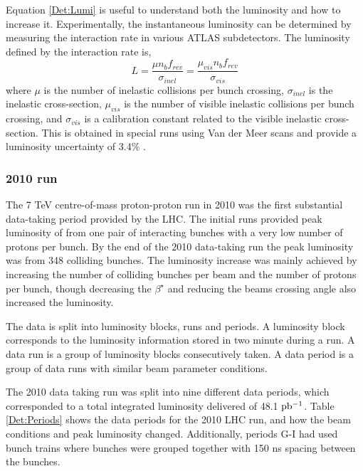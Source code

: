 Equation \ref{Det:Lumi} is useful to understand both the luminosity and how to increase it. 
Experimentally, the instantaneous luminosity can be determined by measuring the interaction rate in various ATLAS subdetectors.
The luminosity defined by the interaction rate is,
\begin{equation}
L=\frac{\mu n_bf_{rev}}{\sigma_{inel}}=\frac{\mu_{vis}n_bf_{rev}}{\sigma_{vis}}
\label{Det:Lumi2}
\end{equation}
where $\mu$ is the number of inelastic collisions per bunch crossing, $\sigma_{inel}$ is the inelastic cross-section, $\mu_{vis}$ is the number of visible inelastic collisions per bunch crossing, and $\sigma_{vis}$ is a calibration constant related to the visible inelastic cross-section. 
This is obtained in special runs using Van der Meer scans and provide a luminosity uncertainty of 3.4\% \cite{ref:Lumi}.

\subsubsection{2010 run}
The 7 TeV centre-of-mass proton-proton run in 2010 was the first substantial data-taking period provided by the LHC. 
The initial runs provided peak luminosity of  from one pair of interacting bunches with a very low number of protons per bunch. 
By the end of the 2010 data-taking run the peak luminosity was  from 348 colliding bunches.
The luminosity increase was mainly achieved by increasing the number of colliding bunches per beam and the number of protons per bunch, though decreasing the $\beta^\star$ and reducing the beams crossing angle also increased the luminosity.

The data is split into luminosity blocks, runs and periods.
A luminosity block corresponds to the luminosity information stored in two minute during a run. 
A data run is a group of luminosity blocks consecutively taken. 
A data period is a group of data runs with similar beam parameter conditions.

The 2010 data taking run was split into nine different data periods, which corresponded to a total integrated luminosity delivered of 48.1 $\rm pb^{-1}$.
Table \ref{Det:Periods} shows the data periods for the 2010 LHC run, and how the beam conditions and peak luminosity changed.  
Additionally, periods G-I had used bunch trains where bunches were grouped together with 150 ns spacing between the bunches.  


